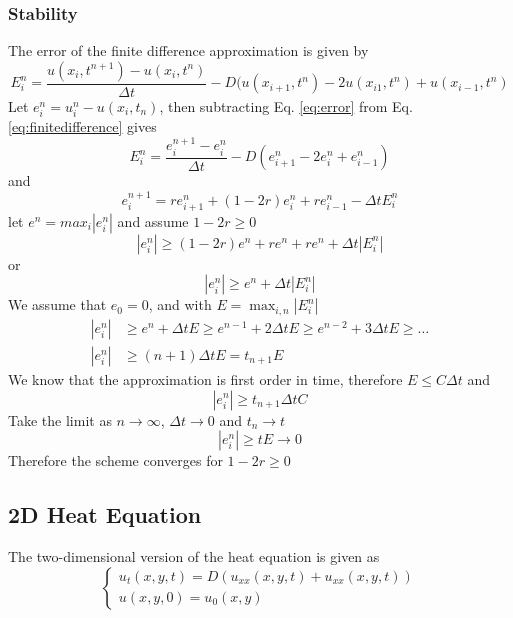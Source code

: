 \documentclass[11pt,a4paper,noindent]{article}
\begin{document}
\subsubsection{Stability}
The error of the finite difference approximation is given by
\begin{equation} \label{eq:error}
E_i^n = \frac{u(x_i,t^{n+1})-u(x_i,t^{n})}{\Delta t} - D (u(x_{i+1},t^{n}) - 2u(x_{i1},t^{n}) + u(x_{i-1},t^{n})
\end{equation}
Let $e_i^n = u_i^n - u(x_i,t_{n})$, then subtracting Eq. \ref{eq:error} from Eq. \ref{eq:finitedifference} gives
\begin{equation}
E_i^n = \frac{e^{n+1}_i-e^{n}_i}{\Delta t} - D (e^n_{i+1} - 2e^n_{i} + e^n_{i-1})
\end{equation}
and
\begin{equation}
e^{n+1}_i = r e^n_{i+1} + (1-2r)e^n_{i} + r e^n_{i-1} - \Delta t E_i^n
\end{equation}
let $e^n = max_i|e_i^n|$ and assume $1-2r\geq 0$
\begin{equation}
|e_i^n| \geq (1-2r)e^n + re^n + re^n + \Delta t |E_i^n|
\end{equation}
or
\begin{equation}
|e_i^n| \geq e^n + \Delta t |E_i^n|
\end{equation}
We assume that $e_0=0$, and with $E = \max_{i,n}|E_i^n|$
\begin{align}
|e_i^n| &\geq e^n + \Delta t E \geq e^{n-1} + 2\Delta t E \geq e^{n-2} + 3\Delta t E \geq \ldots \\
|e_i^n| &\geq (n+1)\Delta t E = t_{n+1} E
\end{align}
We know that the approximation is first order in time, therefore $E \leq C \Delta t$ and
\begin{equation}
|e_i^n| \geq t_{n+1}\Delta t C
\end{equation}
Take the limit as $n \rightarrow \infty$, $\Delta t \rightarrow 0$ and $t_n \rightarrow t$
\begin{equation}
|e_i^n| \geq t E \rightarrow 0
\end{equation}
Therefore the scheme converges for $1-2r\geq 0$

\subsection{2D Heat Equation}
The two-dimensional version of the heat equation is given as
\begin{equation}\label{eq:diffusion2}
\left\lbrace \begin{array}{c}
u_t(x,y,t) = D (u_{xx}(x,y,t) + u_{xx}(x,y,t)) \\
u(x,y,0) = u_0(x,y)
\end{array}
\right.
\end{equation}
\end{document}

